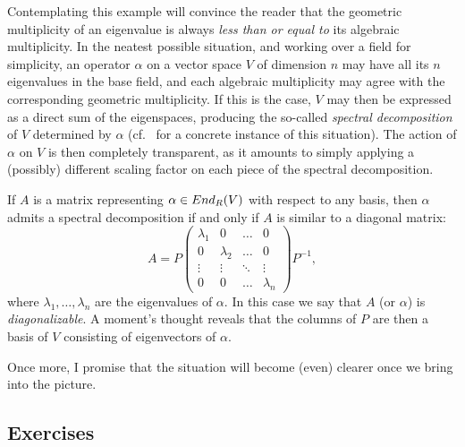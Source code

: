 Contemplating this example will convince the reader that the geometric
multiplicity of an eigenvalue is always \emph{less than or equal to}
its algebraic multiplicity. In the neatest possible situation, and
working over a field for simplicity, an operator $\alpha$
on a vector space $V$ of dimension $n$ may have all its $n$ eigenvalues in
the base field, and each algebraic multiplicity may agree with the
corresponding geometric multiplicity. If this is the case, $V$ may
then be expressed as a direct sum of the eigenspaces, producing the
so-called \emph{spectral decomposition} of $V$ determined by $\alpha$
(cf.\ 
for a concrete instance of this situation). The action of $\alpha$ on
$V$ is then completely transparent, as it amounts to simply applying a
(possibly) different scaling factor on each piece of the spectral
decomposition.

If $A$ is a matrix representing $\alpha \in End_R(V)$ with respect to
any basis, then $\alpha$ admits a spectral decomposition if and only
if $A$ is similar to a diagonal matrix:
\[
  A = P
  \begin{pmatrix}
    \lambda_1 & 0 & \dots & 0 \\
    0 & \lambda_2 & \dots & 0 \\
    \vdots & \vdots & \ddots & \vdots \\
    0 & 0 & \dots & \lambda_n
  \end{pmatrix}
  P^{-1},
\]
where $\lambda_1, \dots, \lambda_n$ are the eigenvalues of
$\alpha$. In this case we say that $A$ (or $\alpha$) is
\emph{diagonalizable}. A moment's thought reveals that the columns of
$P$ are then a basis of $V$ consisting of eigenvectors of $\alpha$.

Once more, I promise that the situation will become (even) clearer
once we bring  into the picture.

\subsection*{Exercises}

